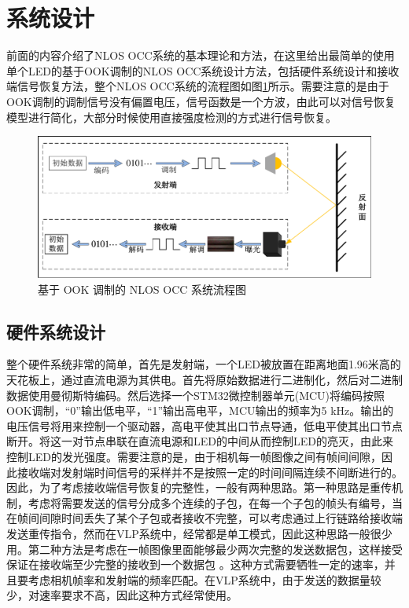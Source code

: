 \section{系统设计}
前面的内容介绍了NLOS OCC系统的基本理论和方法，在这里给出最简单的使用单个LED的基于OOK调制的NLOS OCC系统设计方法，包括硬件系统设计和接收端信号恢复方法，整个NLOS OCC系统的流程图如图\ref{fig:OOK NLOS OCC}所示。需要注意的是由于OOK调制的调制信号没有偏置电压，信号函数是一个方波，由此可以对信号恢复模型进行简化，大部分时候使用直接强度检测的方式进行信号恢复。
\begin{figure}[!htbp]
  \centering
  \includegraphics[width=\linewidth]{FIG/OOK NLOS OCC.pdf}
  \caption{基于 OOK 调制的 NLOS OCC 系统流程图}
  \label{fig:OOK NLOS OCC}
\end{figure}

\subsection{硬件系统设计}
整个硬件系统非常的简单，首先是发射端，一个LED被放置在距离地面1.96米高的天花板上，通过直流电源为其供电。首先将原始数据进行二进制化，然后对二进制数据使用曼彻斯特编码。然后选择一个STM32微控制器单元(MCU)将编码按照OOK调制，“0”输出低电平，“1”输出高电平，MCU输出的频率为5 kHz。输出的电压信号将用来控制一个驱动器，高电平使其出口节点导通，低电平使其出口节点断开。将这一对节点串联在直流电源和LED的中间从而控制LED的亮灭，由此来控制LED的发光强度。需要注意的是，由于相机每一帧图像之间有帧间间隙，因此接收端对发射端时间信号的采样并不是按照一定的时间间隔连续不间断进行的。因此，为了考虑接收端信号恢复的完整性，一般有两种思路。第一种思路是重传机制，考虑将需要发送的信号分成多个连续的子包，在每一个子包的帧头有编号，当在帧间间隙时间丢失了某个子包或者接收不完整，可以考虑通过上行链路给接收端发送重传指令，然而在VLP系统中，经常都是单工模式，因此这种思路一般很少用。第二种方法是考虑在一帧图像里面能够最少两次完整的发送数据包，这样接受保证在接收端至少完整的接收到一个数据包 。这种方式需要牺牲一定的速率，并且要考虑相机帧率和发射端的频率匹配。在VLP系统中，由于发送的数据量较少，对速率要求不高，因此这种方式经常使用。
 
